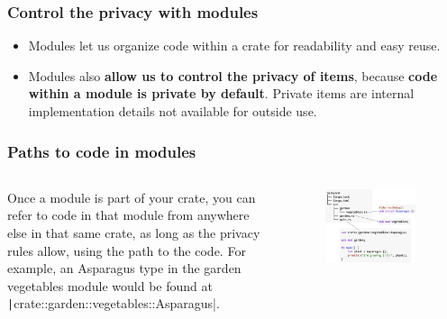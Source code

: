 \documentclass{beamer}
\begin{document}
\begin{frame}[fragile]
	\frametitle{Control the privacy with modules}
	\begin{itemize}
		\item Modules let us organize code within a crate for readability and easy reuse. 
		\item 	Modules also\textbf{ allow us to control the privacy of items}, because \textbf{code within a module is private by default}. Private items are internal implementation details not available for outside use.
	\end{itemize}
\end{frame}


\begin{frame}[fragile]
	\frametitle{Paths to code in modules}
	\begin{columns}
		Once a module is part of your crate, you can refer to code in that module from anywhere else in that same crate, as long as the privacy rules allow, using the path to the code. For example, an Asparagus type in the garden vegetables module would be found at \texttt|crate::garden::vegetables::Asparagus|.
		\begin{figure}
			\centering
			\includegraphics[width=0.9\textwidth]{./img/trpl04-07.png}
		\end{figure}
	\end{columns}
\end{frame}
\end{document}
